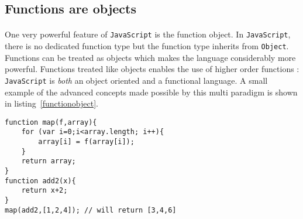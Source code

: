 \subsection{Functions are objects}
\paragraph{}
One very powerful feature of \texttt{JavaScript} is the function object. In \texttt{JavaScript}, there is no dedicated function type but the function type inherits from \texttt{Object}. Functions can be treated as objects which makes the language considerably more powerful. Functions treated like objects enables the use of higher order functions :  \texttt{JavaScript} is \emph{both} an object oriented and a functional language. A small example of the advanced concepts made possible by this multi paradigm is shown in listing~\ref{functionobject}.

\begin{lstlisting}[caption=Demonstration of functions as objects.,label=functionobject]
function map(f,array){
	for (var i=0;i<array.length; i++){
		array[i] = f(array[i]);
	}
	return array;
}
function add2(x){
	return x+2;
}
map(add2,[1,2,4]); // will return [3,4,6]
\end{lstlisting}	
